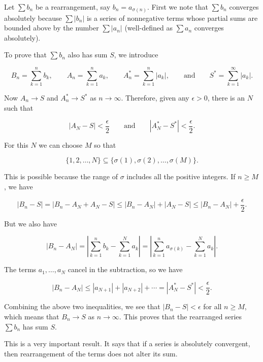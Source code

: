     \begin{proofenv}
        Let \(\sum b_n\) be a rearrangement, say \(b_n=a_{\sigma(n)}\). First we note that \(\sum b_n\) converges absolutely because \(\sum |b_n|\) is a series of nonnegative terms whose partial sums are bounded above by the number \(\sum |a_n|\) (well-defined as \(\sum a_n\) converges absolutely).

        To prove that \(\sum b_n\) also has sum \(S\), we introduce

        \[
        B_n=\sum_{k=1}^{n}b_k,\qquad
        A_n=\sum_{k=1}^{n}a_k,\qquad
        A_n^*=\sum_{k=1}^{n}|a_k|,\qquad
        \text{and}\qquad
        S^*=\sum_{k=1}^{\infty}|a_k|.
        \]

        Now \(A_n\to S\) and \(A_n^*\to S^*\) as \(n\to\infty\). Therefore, given any \(\epsilon>0\), there is an \(N\) such that

        \[
        |A_N-S|<\frac{\epsilon}{2}
        \qquad
        \text{and}
        \qquad
        |A_N^*-S^*|<\frac{\epsilon}{2}.
        \]

        For this \(N\) we can choose \(M\) so that

        \[
        \{1,2,\dots,N\}\subseteq\{\sigma(1),\sigma(2),\dots,\sigma(M)\}.
        \]

        This is possible because the range of \(\sigma\) includes all the positive integers. If \(n\ge M\), we have

        \[
        |B_n-S|=|B_n-A_N+A_N-S|\le |B_n-A_N|+|A_N-S|\le |B_n-A_N|+\frac{\epsilon}{2}.
        \]

        But we also have

        \[
        |B_n-A_N|
        =
        \left|
        \sum_{k=1}^{n}b_k-\sum_{k=1}^{N}a_k
        \right|
        =
        \left|
        \sum_{k=1}^{n}a_{\sigma(k)}-\sum_{k=1}^{N}a_k
        \right|.
        \]

        The terms \(a_1,\dots,a_N\) cancel in the subtraction, so we have

        \[
        |B_n-A_N|\le |a_{N+1}|+|a_{N+2}|+\cdots=|A_N^*-S^*|<\frac{\epsilon}{2}.
        \]

        Combining the above two inequalities, we see that \(|B_n-S|<\epsilon\) for all \(n\ge M\), which means that \(B_n\to S\) as \(n\to\infty\). This proves that the rearranged series \(\sum b_n\) has sum \(S\).
    \end{proofenv}
    \begin{remarkenv}
        This is a very important result. It says that if a series is absolutely convergent, then rearrangement of the terms does not alter its sum.
    \end{remarkenv}
